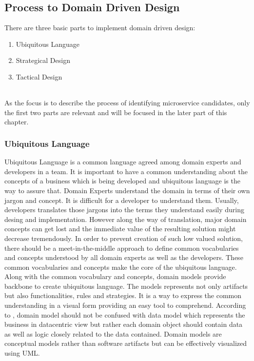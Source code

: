 \subsection{Process to Domain Driven Design}\label{section:domain_driven_design/process_to_domain_driven_design}
There are three basic parts to implement domain driven design:
\begin{enumerate}
\item{Ubiquitous Language}
\item{Strategical Design}
\item{Tactical Design}
\end{enumerate}
\\
As the focus is to describe the process of identifying microservice candidates, only the first two parts are relevant and will be focused in the later part of this chapter.
\subsubsection{Ubiquitous Language}\label{section:domain_driven_design/process_to_domain_driven_design/ubiquitous_language}
Ubiquitous Language is a common language agreed among domain experts and developers in a team. It is important to have a common understanding about the concepts of a business which is being developed and ubiquitous language is the way to assure that. Domain Experts understand the domain in terms of their own jargon and concept. It is difficult for a developer to understand them. Usually, developers translates those jargons into the terms they understand easily during desing and implementation. However along the way of translation, major domain concepts can get lost and the immediate value of the resulting solution might decrease tremendously. In order to prevent creation of such low valued solution, there should be a meet-in-the-middle approach to define common vocabularies and concepts understood by all domain experts as well as the developers. These common vocabularies and concepts make the core of the ubiquitous language.\cite{Evans:2003aa}\cite{Vernon:2013aa}
\\
Along with the common vocabulary and concepts, domain models provide backbone to create ubiquitous language. The models represents not only artifacts but also functionalities, rules and strategies. It is a way to express the common understanding in a visual form providing an easy tool to comprehend.\cite{Evans:2003aa}\cite{Fowler:2006aa} According to \cite{Fowler:2003aa}, domain model should not be confused with data model which represents the business in datacentric view but rather each domain object should contain data as well as logic closely related to the data contained. Domain models are conceptual models rather than software artifacts but can be effectively visualized using \acrshort{UML}.\cite{Scott:2001aa}

